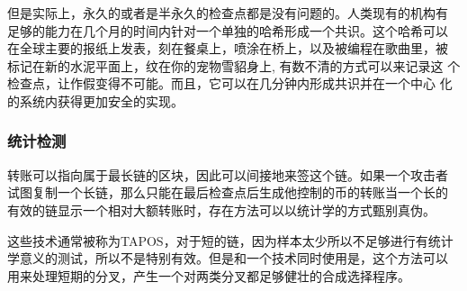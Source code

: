 \documentclass[letterpaper]{article}
\begin{document}
但是实际上，永久的或者是半永久的检查点都是没有问题的。人类现有的机构有
足够的能力在几个月的时间内针对一个单独的哈希形成一个共识。这个哈希可以
在全球主要的报纸上发表，刻在餐桌上，喷涂在桥上，以及被编程在歌曲里，被
标记在新的水泥平面上，纹在你的宠物雪貂身上, 有数不清的方式可以来记录这
个检查点，让作假变得不可能。而且，它可以在几分钟内形成共识并在一个中心
化的系统内获得更加安全的实现。

\subsubsection{统计检测}
转账可以指向属于最长链的区块，因此可以间接地来签这个链。如果一个攻击者
试图复制一个长链，那么只能在最后检查点后生成他控制的币的转账当一个长的
有效的链显示一个相对大额转账时，存在方法可以以统计学的方式甄别真伪。

这些技术通常被称为TAPOS，对于短的链，因为样本太少所以不足够进行有统计
学意义的测试，所以不是特别有效。但是和一个技术同时使用是，这个方法可以
用来处理短期的分叉，产生一个对两类分叉都足够健壮的合成选择程序。
\end{document}
